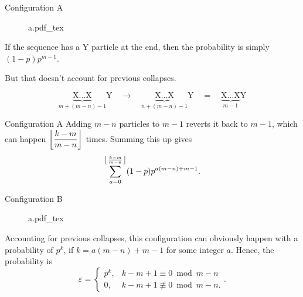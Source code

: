 \documentclass[xcolor={usenames,dvipsnames}]{beamer}
\DeclarePairedDelimiter\floor{\lfloor}{\rfloor}
\begin{document}
\begin{frame}{Configuration A}
  \begin{center}
  \begin{figure}[ht]
    \centering
    \def\svgwidth{0.6\textwidth}
    {a.pdf_tex}
  \end{figure}
\end{center}

  If the sequence has a Y particle at the end, then the probability is simply $(1-p)p^{m-1}$.

  But that doesn't account for previous collapses.
  \begin{figure}[H]
      \vspace{-1.5em}
      \begin{equation*}
        \underbrace{\text{X}\dots\text{X}}_{m + (m-n) - 1}\text{Y} \quad \longrightarrow \quad \underbrace{\text{X}\dots\text{X}}_{n+(m-n)-1}\text{Y}\quad = \quad \underbrace{\text{X}\dots\text{X}}_{m-1}\text{Y} 
      \end{equation*}
      \vspace{-2em}
    \end{figure}
  \end{frame}
  \begin{frame}{Configuration A}
    Adding $m-n$ particles to $m-1$ reverts it back to $m-1$, which can happen $\floor*{\dfrac{k-m}{m-n}}$ times. Summing this up gives \[\sum_{a = 0}^{\floor*{\frac{k-m}{m-n}}} (1-p)p^{a(m-n) + m-1}.\]
\end{frame}
\begin{frame}{Configuration B}
    \begin{center}
  \begin{figure}[ht]
    \centering
    \def\svgwidth{0.6\textwidth}
    {a.pdf_tex}
  \end{figure}
\end{center}

  Accounting for previous collapses, this configuration can obviously happen with a probability of $p^{k}$, if $k = a(m-n) + m-1$ for some integer $a$. Hence, the probability is \[
    \varepsilon = \begin{cases} p^{k}, &k-m+1 \equiv 0 \bmod m-n \\ 0, &k-m+1 \not\equiv 0 \bmod m-n. \end{cases}
  .\] 
\end{frame}
\end{document}
